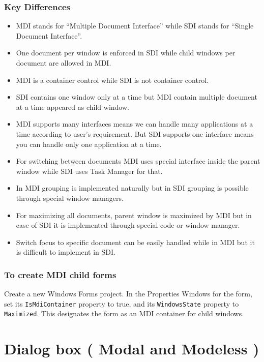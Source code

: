\subsubsection*{Key Differences}
\begin{itemize}
	\item MDI stands for “Multiple Document Interface” while SDI stands for “Single Document
	Interface”.
	\item One document per window is enforced in SDI while child windows per document are
	allowed in MDI.
	\item MDI is a container control while SDI is not container control.
	\item SDI contains one window only at a time but MDI contain multiple document at a time
	appeared as child window.
	\item MDI supports many interfaces means we can handle many applications at a time according to
	user’s requirement. But SDI supports one interface means you can handle only
	one application at a time.
	\item For switching between documents MDI uses special interface inside the parent window
	while SDI uses Task Manager for that.
	\item In MDI grouping is implemented naturally but in SDI grouping is possible through special
	window managers.
	\item For maximizing all documents, parent window is maximized by MDI but in case of SDI it is
	implemented through special code or window manager.
	\item Switch focus to specific document can be easily handled while in MDI but it is difficult to
	implement in SDI.
\end{itemize}

\subsubsection*{To create MDI child forms}
Create a new Windows Forms project. In the Properties Windows for the form, set its
\texttt{IsMdiContainer} property to true, and its \texttt{WindowsState} property to \texttt{Maximized}.
This designates the form as an MDI container for child windows.


\section{Dialog box ( Modal and Modeless )}

